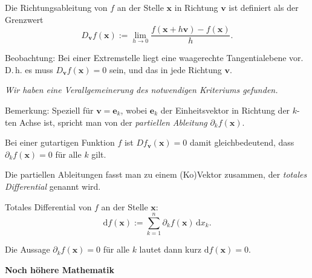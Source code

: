 \documentclass{beamer}
\newcommand{\strong}[1]{\textsf{\textbf{#1}}}
\begin{document}
\begin{frame}
\begin{Definition}
Die Richtungsableitung von $f$ an der Stelle $\mathbf x$ in
Richtung $\mathbf v$ ist definiert als der Grenzwert
\[D_{\mathbf v} f(\mathbf x) := \lim_{h\to 0}\frac{f(\mathbf x+h\mathbf v)-f(\mathbf x)}{h}.\]
\end{Definition}
\end{frame}

\begin{frame}
Beobachtung: Bei einer Extremstelle liegt eine waagerechte
Tangentialebene vor. D.\,h. es muss $D_{\mathbf v} f(\mathbf x)=0$
sein, und das in jede Richtung $\mathbf v$.\pause

\vspace{0.8em}
\emph{Wir haben eine Verallgemeinerung des notwendigen Kriteriums
gefunden.}
\end{frame}

\begin{frame}
Bemerkung: Speziell für $\mathbf v = \mathbf e_k$, wobei
$\mathbf e_k$ der Einheitsvektor in Richtung der $k$-ten Achse ist,
spricht man von der \emph{partiellen Ableitung}
$\partial_k f(\mathbf x)$.
\pause

\vspace{0.8em}
Bei einer gutartigen Funktion $f$ ist $Df_{\mathbf v}(\mathbf x)=0$
damit gleichbedeutend, dass $\partial_k f(\mathbf x)=0$ für alle
$k$ gilt.
\end{frame}

\begin{frame}
Die partiellen Ableitungen fasst man zu einem (Ko)Vektor zusammen,
der \emph{totales Differential} genannt wird.\pause

\begin{Definition}
Totales Differential von $f$ an der Stelle $\mathbf x$:
\[\mathrm df(\mathbf x) := \sum_{k=1}^n \partial_k f(\mathbf x)\,\mathrm dx_k.\]
\end{Definition}
\pause

Die Aussage $\partial_k f(\mathbf x)=0$ für alle $k$ lautet dann
kurz $\mathrm df(\mathbf x)=0$.
\end{frame}

\begin{frame}
\begin{center}
\strong{Noch höhere Mathematik}
\end{center}
\end{frame}
\end{document}
